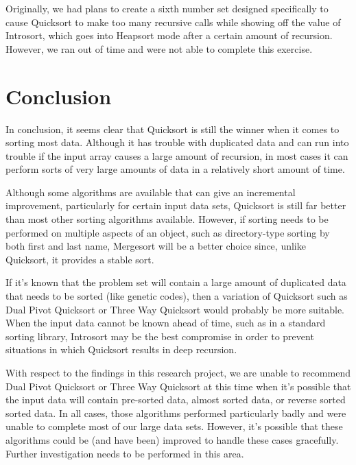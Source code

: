 \documentclass{article}
\begin{document}
Originally, we had plans to create a sixth number set designed specifically
to cause Quicksort to make too many recursive calls while showing off the
value of Introsort, which goes into Heapsort mode after a certain amount
of recursion. However, we ran out of time and were not able to complete
this exercise. 

\section{Conclusion}
In conclusion, it seems clear that Quicksort is still the winner when it 
comes to sorting most data. Although it has trouble with duplicated data
and can run into trouble if the input array causes a large amount of 
recursion, in most cases it can perform sorts of very large amounts of
data in a relatively short amount of time. 

Although some algorithms are available that can give an incremental
improvement, particularly for certain input data sets, Quicksort is
still far better than most other sorting algorithms available. However,
if sorting needs to be performed on multiple aspects of an object,
such as directory-type sorting by both first and last name, Mergesort
will be a better choice since, unlike Quicksort, it provides a stable
sort. 

If it's known that the problem set will contain a large amount of duplicated
data that needs to be sorted (like genetic codes), then a variation of
Quicksort such as Dual Pivot Quicksort or Three Way Quicksort would
probably be more suitable. When the input data cannot be known ahead of
time, such as in a standard sorting library, Introsort may be the best
compromise in order to prevent situations in which Quicksort results
in deep recursion.

With respect to the findings in this research project, we are unable to
recommend Dual Pivot Quicksort or Three Way Quicksort at this time when
it's possible that the input data will contain pre-sorted data, almost
sorted data, or reverse sorted sorted data. In all cases, those 
algorithms performed particularly badly and were unable to complete
most of our large data sets. However, it's possible that these algorithms
could be (and have been) improved to handle these cases gracefully.
Further investigation needs to be performed in this area. 
\end{document}
